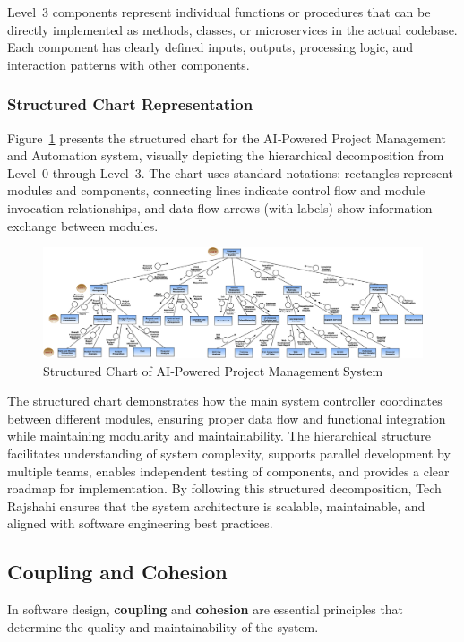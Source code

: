 \documentclass[12pt,a4paper]{article}
\begin{document}
Level~3 components represent individual functions or procedures that can be directly implemented as methods, classes, or microservices in the actual codebase.  Each component has clearly defined inputs, outputs, processing logic, and interaction patterns with other components.

\subsubsection{Structured Chart Representation}
Figure~\ref{fig:system_architecture} presents the structured chart for the AI‑Powered Project Management and Automation system, visually depicting the hierarchical decomposition from Level~0 through Level~3.  The chart uses standard notations: rectangles represent modules and components, connecting lines indicate control flow and module invocation relationships, and data flow arrows (with labels) show information exchange between modules.

\begin{figure}[H]
    \centering
    \includegraphics[width=\textwidth]{Fig/Structured_Chart.png}
    \caption{Structured Chart of AI‑Powered Project Management System}
    \label{fig:system_architecture}
\end{figure}

The structured chart demonstrates how the main system controller coordinates between different modules, ensuring proper data flow and functional integration while maintaining modularity and maintainability.  The hierarchical structure facilitates understanding of system complexity, supports parallel development by multiple teams, enables independent testing of components, and provides a clear roadmap for implementation.  By following this structured decomposition, Tech Rajshahi ensures that the system architecture is scalable, maintainable, and aligned with software engineering best practices.

\subsection{Coupling and Cohesion}
In software design, \textbf{coupling} and \textbf{cohesion} are essential principles that determine the quality and maintainability of the system.
\end{document}
